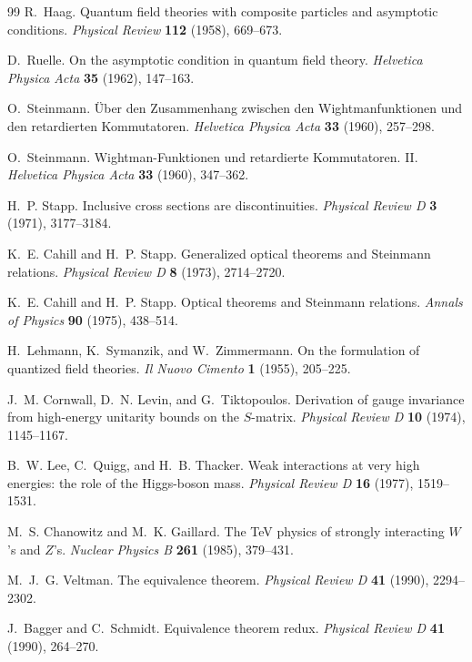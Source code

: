 \begin{thebibliography}{99}
R.~Haag.
Quantum field theories with composite particles and asymptotic conditions.
\emph{Physical Review} \textbf{112} (1958), 669--673.

D.~Ruelle.
On the asymptotic condition in quantum field theory.
\emph{Helvetica Physica Acta} \textbf{35} (1962), 147--163.

O.~Steinmann.
{\"U}ber den Zusammenhang zwischen den Wightmanfunktionen und den retardierten
Kommutatoren.
\emph{Helvetica Physica Acta} \textbf{33} (1960), 257--298.

O.~Steinmann.
Wightman-Funktionen und retardierte Kommutatoren. II.
\emph{Helvetica Physica Acta} \textbf{33} (1960), 347--362.

H.~P. Stapp.
Inclusive cross sections are discontinuities.
\emph{Physical Review D} \textbf{3} (1971), 3177--3184.

K.~E. Cahill and H.~P. Stapp.
Generalized optical theorems and Steinmann relations.
\emph{Physical Review D} \textbf{8} (1973), 2714--2720.

K.~E. Cahill and H.~P. Stapp.
Optical theorems and Steinmann relations.
\emph{Annals of Physics} \textbf{90} (1975), 438--514.

H.~Lehmann, K.~Symanzik, and W.~Zimmermann.
On the formulation of quantized field theories.
\emph{Il Nuovo Cimento} \textbf{1} (1955), 205--225.

J.~M. Cornwall, D.~N. Levin, and G.~Tiktopoulos.
Derivation of gauge invariance from high-energy unitarity bounds on the
\(S\)-matrix.
\emph{Physical Review D} \textbf{10} (1974), 1145--1167.

B.~W. Lee, C.~Quigg, and H.~B. Thacker.
Weak interactions at very high energies: the role of the Higgs-boson mass.
\emph{Physical Review D} \textbf{16} (1977), 1519--1531.

M.~S. Chanowitz and M.~K. Gaillard.
The TeV physics of strongly interacting \(W\)'s and \(Z\)'s.
\emph{Nuclear Physics B} \textbf{261} (1985), 379--431.

M.~J.~G. Veltman.
The equivalence theorem.
\emph{Physical Review D} \textbf{41} (1990), 2294--2302.

J.~Bagger and C.~Schmidt.
Equivalence theorem redux.
\emph{Physical Review D} \textbf{41} (1990), 264--270.


\end{thebibliography}

